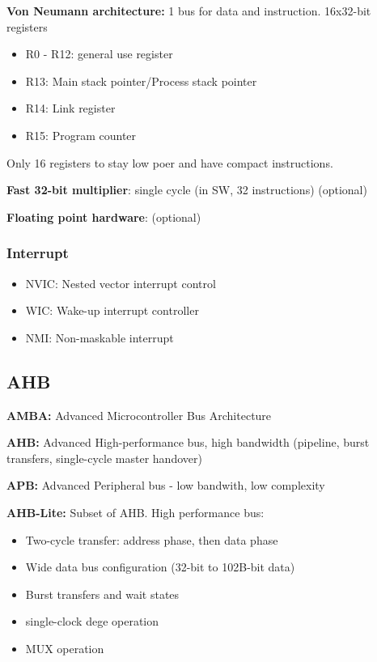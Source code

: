 \textbf{Von Neumann architecture:} 1 bus for data and instruction.
\bigbreak
16x32-bit registers
\begin{itemize}
  \item R0 - R12: general use register
  \item R13: Main stack pointer/Process stack pointer
  \item R14: Link register
  \item R15: Program counter
\end{itemize}

Only 16 registers to stay low poer and have compact instructions.

\textbf{Fast 32-bit multiplier}: single cycle (in SW, 32 instructions) (optional)

\textbf{Floating point hardware}: (optional)


\subsubsection{Interrupt}
\begin{itemize}
  \item NVIC: Nested vector interrupt control
  \item WIC: Wake-up interrupt controller
  \item NMI: Non-maskable interrupt
\end{itemize}



\subsection{AHB}
\textbf{AMBA:} Advanced Microcontroller Bus Architecture

\textbf{AHB:} Advanced High-performance bus, high bandwidth (pipeline, burst transfers, single-cycle master handover)

\textbf{APB:} Advanced Peripheral bus - low bandwith, low complexity

\textbf{AHB-Lite:} Subset of AHB. High performance bus:
\begin{itemize}
  \item Two-cycle transfer: address phase, then data phase
  \item Wide data bus configuration (32-bit to 102B-bit data)
  \item Burst transfers and wait states
  \item single-clock dege operation
  \item MUX operation
\end{itemize}


